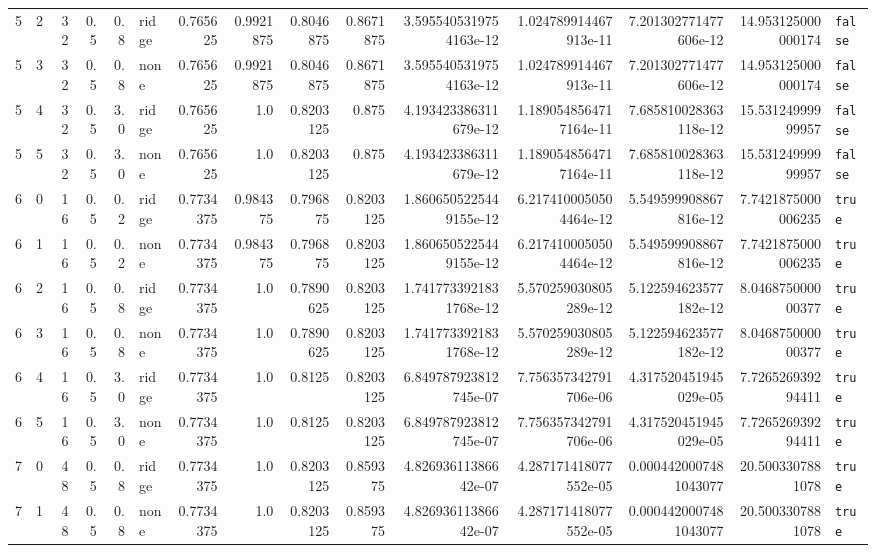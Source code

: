 \documentclass[11pt,a4paper]{article}
\begin{document}
\begin{landscape}
\begin{longtable}{r r r r r l r r r r r r r r l}
5 & 2 & 32 & 0.5 & 0.8 & ridge & 0.765625 & 0.9921875 & 0.8046875 & 0.8671875 & 3.5955405319754163e-12 & 1.024789914467913e-11 & 7.201302771477606e-12 & 14.953125000000174 & \texttt{false} \\
5 & 3 & 32 & 0.5 & 0.8 & none & 0.765625 & 0.9921875 & 0.8046875 & 0.8671875 & 3.5955405319754163e-12 & 1.024789914467913e-11 & 7.201302771477606e-12 & 14.953125000000174 & \texttt{false} \\
5 & 4 & 32 & 0.5 & 3.0 & ridge & 0.765625 & 1.0 & 0.8203125 & 0.875 & 4.193423386311679e-12 & 1.1890548564717164e-11 & 7.685810028363118e-12 & 15.53124999999957 & \texttt{false} \\
5 & 5 & 32 & 0.5 & 3.0 & none & 0.765625 & 1.0 & 0.8203125 & 0.875 & 4.193423386311679e-12 & 1.1890548564717164e-11 & 7.685810028363118e-12 & 15.53124999999957 & \texttt{false} \\
6 & 0 & 16 & 0.5 & 0.2 & ridge & 0.7734375 & 0.984375 & 0.796875 & 0.8203125 & 1.8606505225449155e-12 & 6.2174100050504464e-12 & 5.549599908867816e-12 & 7.7421875000006235 & \texttt{true} \\
6 & 1 & 16 & 0.5 & 0.2 & none & 0.7734375 & 0.984375 & 0.796875 & 0.8203125 & 1.8606505225449155e-12 & 6.2174100050504464e-12 & 5.549599908867816e-12 & 7.7421875000006235 & \texttt{true} \\
6 & 2 & 16 & 0.5 & 0.8 & ridge & 0.7734375 & 1.0 & 0.7890625 & 0.8203125 & 1.7417733921831768e-12 & 5.570259030805289e-12 & 5.122594623577182e-12 & 8.046875000000377 & \texttt{true} \\
6 & 3 & 16 & 0.5 & 0.8 & none & 0.7734375 & 1.0 & 0.7890625 & 0.8203125 & 1.7417733921831768e-12 & 5.570259030805289e-12 & 5.122594623577182e-12 & 8.046875000000377 & \texttt{true} \\
6 & 4 & 16 & 0.5 & 3.0 & ridge & 0.7734375 & 1.0 & 0.8125 & 0.8203125 & 6.849787923812745e-07 & 7.756357342791706e-06 & 4.317520451945029e-05 & 7.726526939294411 & \texttt{true} \\
6 & 5 & 16 & 0.5 & 3.0 & none & 0.7734375 & 1.0 & 0.8125 & 0.8203125 & 6.849787923812745e-07 & 7.756357342791706e-06 & 4.317520451945029e-05 & 7.726526939294411 & \texttt{true} \\
7 & 0 & 48 & 0.5 & 0.8 & ridge & 0.7734375 & 1.0 & 0.8203125 & 0.859375 & 4.82693611386642e-07 & 4.287171418077552e-05 & 0.0004420007481043077 & 20.5003307881078 & \texttt{true} \\
7 & 1 & 48 & 0.5 & 0.8 & none & 0.7734375 & 1.0 & 0.8203125 & 0.859375 & 4.82693611386642e-07 & 4.287171418077552e-05 & 0.0004420007481043077 & 20.5003307881078 & \texttt{true} \\

\end{longtable}
\end{landscape}
\end{document}
